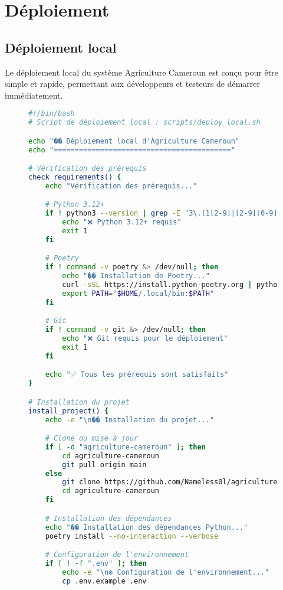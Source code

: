 \section{Déploiement}

\subsection{Déploiement local}

Le déploiement local du système Agriculture Cameroun est conçu pour être simple et rapide, permettant aux développeurs et testeurs de démarrer immédiatement.

\begin{figure}[h]
\centering
\begin{lstlisting}[language=bash, caption=Script de déploiement local automatisé]
#!/bin/bash
# Script de déploiement local : scripts/deploy_local.sh

echo "�� Déploiement local d'Agriculture Cameroun"
echo "=========================================="

# Vérification des prérequis
check_requirements() {
    echo "Vérification des prérequis..."

    # Python 3.12+
    if ! python3 --version | grep -E "3\.(1[2-9]|[2-9][0-9])" > /dev/null; then
        echo "❌ Python 3.12+ requis"
        exit 1
    fi

    # Poetry
    if ! command -v poetry &> /dev/null; then
        echo "�� Installation de Poetry..."
        curl -sSL https://install.python-poetry.org | python3 -
        export PATH="$HOME/.local/bin:$PATH"
    fi

    # Git
    if ! command -v git &> /dev/null; then
        echo "❌ Git requis pour le déploiement"
        exit 1
    fi

    echo "✅ Tous les prérequis sont satisfaits"
}

# Installation du projet
install_project() {
    echo -e "\n�� Installation du projet..."

    # Clone ou mise à jour
    if [ -d "agriculture-cameroun" ]; then
        cd agriculture-cameroun
        git pull origin main
    else
        git clone https://github.com/Nameless0l/agriculture-cameroun.git
        cd agriculture-cameroun
    fi

    # Installation des dépendances
    echo "�� Installation des dépendances Python..."
    poetry install --no-interaction --verbose

    # Configuration de l'environnement
    if [ ! -f ".env" ]; then
        echo -e "\n⚙️ Configuration de l'environnement..."
        cp .env.example .env


\end{lstlisting}
\end{figure}
